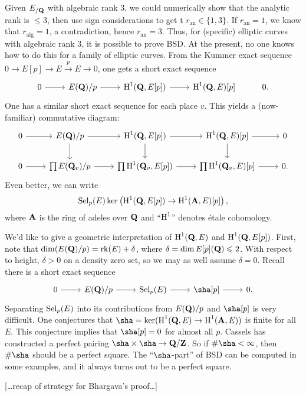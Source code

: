 \documentclass[oneside]{article}
\begin{document}
Given $E_{/\mathbf{Q}}$ with algebraic rank $3$, we could numerically show that the 
analytic rank is $\leqslant 3$, then use sign considerations to get t
$r_\mathrm{an}\in \{1,3\}$. If $r_\mathrm{an}=1$, we know that 
$r_\mathrm{alg}=1$, a contradiction, hence $r_\mathrm{an}=3$. Thus, for 
(specific) elliptic curves with algebraic rank $3$, it is possible to prove 
BSD. At the present, no one knows how to do this for a family of elliptic 
curves. From the Kummer exact sequence $0\to E[p] \to E\xrightarrow p E \to 0$, 
one gets a short exact sequence
\[\begin{tikzcd}
  0 \ar[r] 
    & E(\dQ)/p \ar[r] 
    & \h^1(\dQ,E[p]) \ar[r] 
    & \h^1(\dQ,E)[p] 
    & 0 .
\end{tikzcd}\]
One has a similar short exact sequence for each place $v$. This yields a 
(now-familiar) commutative diagram:
\[\begin{tikzcd}
  0 \ar[r] 
    & E(\dQ)/p \ar[r] \ar[d] 
    & \h^1(\dQ,E[p]) \ar[r] \ar[d] 
    & \h^1(\dQ,E)[p] \ar[d] \ar[r] 
    & 0 \\
  0 \ar[r] 
    & \prod E(\dQ_v)/p \ar[r] 
    & \prod \h^1(\dQ_v,E[p]) \ar[r] 
    & \prod \h^1(\dQ_v,E)[p] \ar[r] 
    & 0.
\end{tikzcd}\]
Even better, we can write 
\[
  \operatorname{Sel}_p(E)  \ker\left(\operatorname{H}^1(\mathbf{Q},E[p])\to \operatorname{H}^1(\mathbf{A},E)[p]\right) ,
\]
where $\mathbf{A}$ is the ring of adeles over $\mathbf{Q}$ and ``$\operatorname{H}^1$'' denotes \'etale 
cohomology. 

We'd like to give a geometric interpretation of $\operatorname{H}^1(\mathbf{Q},E)$ and 
$\operatorname{H}^1(\mathbf{Q},E[p])$. First, note that 
$\dim (E(\mathbf{Q})/p)=\operatorname{rk}(E)+\delta$, where $\delta=\dim E[p](\mathbf{Q})\leqslant 2$. 
With respect to height, $\delta>0$ on a density zero set, so we may as well 
assume $\delta=0$. Recall there is a short exact sequence 
\[\begin{tikzcd}
  0 \ar[r] 
    & E(\dQ)/p \ar[r] 
    & \selmer_p(E) \ar[r] 
    & \sha[p] \ar[r] 
    & 0 .
\end{tikzcd}\]
Separating $\operatorname{Sel}_p(E)$ into its contributions from $E(\mathbf{Q})/p$ and 
$\sha[p]$ is very difficult. One conjectures that 
$\sha=\ker(\h^1(\dQ,E) \to \h^1(\dA,E))$ is finite for all $E$. This conjecture 
implies that $\sha[p]=0$ for almost all $p$. Cassels has constructed a perfect 
pairing $\sha\times \sha\to \dQ/\dZ$. So if $\#\sha<\infty$, then $\#\sha$ 
should be a perfect square. The ``$\sha$-part'' of BSD can be computed in 
some examples, and it always turns out to be a perfect square. 

[\ldots recap of strategy for Bhargava's proof\ldots]





\newpage
\printbibliography[heading=bibintoc]
\end{document}
